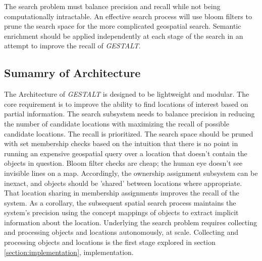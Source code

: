 The search problem must balance precision and recall while not being computationally intractable. An effective search process will use bloom filters to prune the search space for the more complicated geospatial search. Semantic enrichment should be applied independently at each stage of the search in an attempt to improve the recall of \textit{GESTALT}.

\subsection{Sumamry of Architecture}
The Architecture of \textit{GESTALT} is designed to be lightweight and modular. The core requirement is to improve the ability to find locations of interest based on partial information. 
The search subsystem needs to balance precision in reducing the number of candidate locations with maximizing the recall of possible candidate locations. The recall is prioritized. 
The search space should be pruned with set membership checks based on the intuition that there is no point in running an expensive geospatial query over a location that doesn't contain the objects in question. 
Bloom filter checks are cheap; the human eye doesn't see invisible lines on a map. Accordingly, the ownership assignment subsystem can be inexact, and objects should be 'shared' between locations where appropriate. 
That location sharing in membership assignments improves the recall of the system. As a corollary, the subsequent spatial search process maintains the system's precision using the concept mappings of objects to extract implicit information about the location. 
Underlying the search problem requires collecting and processing objects and locations autonomously, at scale. Collecting and processing objects and locations is the first stage explored in section \ref{section:implementation}, implementation. 